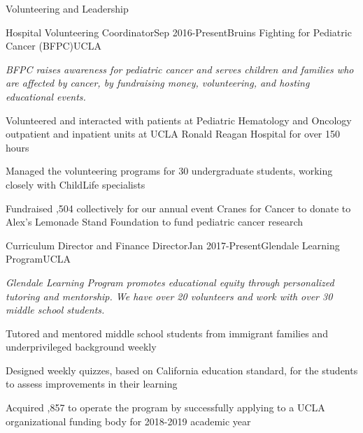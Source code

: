 \documentclass{resume} %
\begin{document}

\begin{rSection}{Volunteering and Leadership}

\begin{rSubsection}{Hospital Volunteering Coordinator}{Sep 2016-Present}{Bruins Fighting for Pediatric Cancer (BFPC)}{UCLA}
\item[] {\em BFPC raises awareness for pediatric cancer and serves children and families who are affected by cancer, by fundraising money, volunteering, and hosting educational events. }
\item Volunteered and interacted with patients at Pediatric Hematology and Oncology outpatient and inpatient units at UCLA Ronald Reagan Hospital for over 150 hours
\item Managed the volunteering programs for 30 undergraduate students, working closely with ChildLife specialists
\item Fundraised ,504 collectively for our annual event Cranes for Cancer to donate to Alex's Lemonade Stand Foundation to fund pediatric cancer research\end{rSubsection}


\begin{rSubsection}{Curriculum Director and Finance Director}{Jan 2017-Present}{Glendale Learning Program}{UCLA}
\item[] {\em Glendale Learning Program promotes educational equity through personalized tutoring and mentorship. We have over 20 volunteers and work with over 30 middle school students.}
\item Tutored and mentored middle school students from immigrant families and underprivileged background weekly
\item Designed weekly quizzes, based on California education standard, for the students to assess improvements in their learning
\item Acquired ,857 to operate the program by successfully applying to a UCLA organizational funding body for 2018-2019 academic year
\end{rSubsection}

\end{rSection}


\end{document}
